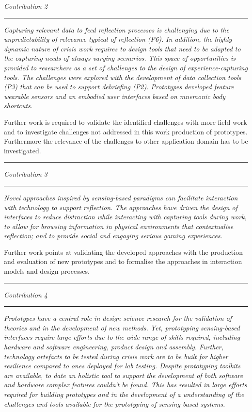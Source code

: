 \emph{Contribution 2} \newline
\rule{\textwidth}{.1pt} \emph{Capturing relevant data to feed reflection
processes is challenging due to the unpredictability of relevance
typical of reflection (P6). In addition, the highly dynamic nature of
crisis work requires to design tools that need to be adapted to the
capturing needs of always varying scenarios. This space of opportunities
is provided to researchers as a set of challenges to the design of
experience-capturing tools. The challenges were explored with the
development of data collection tools (P3) that can be used to support
debriefing (P2). Prototypes developed feature wearable sensors and an
embodied user interfaces based on mnemonic body shortcuts.}

Further work is required to validate the identified challenges with more
field work and to investigate challenges not addressed in this work
production of prototypes. Furthermore the relevance of the challenges to
other application domain has to be investigated. \rule{\textwidth}{.1pt}
\medskip

\emph{Contribution 3} \newline
\rule{\textwidth}{.1pt} \emph{Novel approaches inspired by sensing-based
paradigms can facilitate interaction with technology to support
reflection. The approaches have driven the design of interfaces to
reduce distraction while interacting with capturing tools during work,
to allow for browsing information in physical environments that
contextualise reflection; and to provide social and engaging serious
gaming experiences.}

Further work points at validating the developed approaches with the
production and evaluation of new prototypes and to formalise the
approaches in interaction models and design processes.

\rule{\textwidth}{.1pt}

\medskip

\emph{Contribution 4} \newline
\rule{\textwidth}{.1pt} \emph{Prototypes have a central role in design
science research for the validation of theories and in the development
of new methods. Yet, prototyping sensing-based interfaces require large
efforts due to the wide range of skills required, including hardware and
software engineering, product design and assembly. Further, technology
artefacts to be tested during crisis work are to be built for higher
resilience compared to ones deployed for lab testing. Despite
prototyping toolkits are available, to date an holistic tool to support
the development of both software and hardware complex features couldn't
be found. This has resulted in large efforts required for building
prototypes and in the development of a understanding of the challenges
and tools available for the prototyping of sensing-based systems.}


